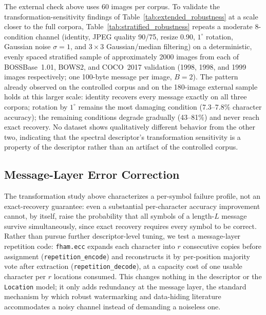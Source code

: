 \documentclass[preprint,12pt]{elsarticle}
\theoremstyle{plain}
\begin{document}
The external check above uses 60 images per corpus. To validate the
transformation-sensitivity findings of Table~\ref{tab:extended_robustness} at
a scale closer to the full corpora, Table~\ref{tab:stratified_robustness}
repeats a
moderate 8-condition channel (identity, JPEG quality 90/75, resize 0.90,
$1^\circ$ rotation, Gaussian noise $\sigma=1$, and $3\times3$ Gaussian/median
filtering) on a deterministic, evenly spaced stratified sample of
approximately 2000 images from each of BOSSBase~1.01, BOWS2, and COCO~2017
validation (1998, 1998, and 1999 images respectively; one 100-byte message
per image, $B=2$). The pattern already observed on the controlled corpus and
on the 180-image external sample holds at this larger scale: identity
recovers every message exactly on all three corpora; rotation by $1^\circ$
remains the most damaging condition (7.3--7.8\% character accuracy); the
remaining conditions degrade gradually (43--81\%) and never reach exact
recovery. No dataset shows qualitatively different behavior from the other
two, indicating that the spectral descriptor's transformation sensitivity is
a property of the descriptor rather than an artifact of the controlled
corpus.

\begin{table}[!t]
\centering
\caption{Stratified Robustness Check (100 Bytes, $\approx$2000 Images per Corpus)}
\label{tab:stratified_robustness}

\end{table}

\subsection{Message-Layer Error Correction}
\label{sec:ecc}

The transformation study above characterizes a per-symbol failure profile,
not an exact-recovery guarantee: even a substantial per-character accuracy
improvement cannot, by itself, raise the probability that all symbols of a
length-$L$ message survive simultaneously, since exact recovery requires
every symbol to be correct. Rather than pursue further descriptor-level
tuning, we test a message-layer repetition code: \texttt{fham.ecc} expands
each character into $r$ consecutive copies before assignment
(\texttt{repetition\_encode}) and reconstructs it by per-position majority
vote after extraction (\texttt{repetition\_decode}), at a capacity cost of
one usable character per $r$ locations consumed. This changes nothing in
the descriptor or the \texttt{Location} model; it only adds redundancy at
the message layer, the standard mechanism by which robust watermarking and
data-hiding literature accommodates a noisy channel instead of demanding a
noiseless one.
\end{document}
